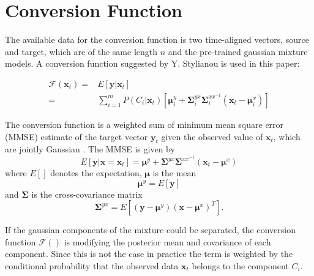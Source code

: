 \section{Conversion Function} %
\label{sec:conversion_function}
The available data for the conversion function is two time-aligned vectors, source and target, which are of the same length $n$ and the pre-trained gaussian mixture models. A conversion function suggested by Y. Stylianou \cite{stylianou95} is used in this paper:
\begin{defn}
	\label{defn:conversion_function}
	\begin{equation}
		\label{eq:conversion_function}
		\begin{split}
		\mathcal{F}(\mathbf{x}_t) =& E[\mathbf{y}\vert \mathbf{x}_t]\\
		 =& \sum_{i=1}^{m}P(C_i \vert \mathbf{x}_t)[\boldsymbol{\mu}_i^y + \mathbf{\Sigma}_i^{yx} \mathbf{\Sigma}_i^{xx^{-1}} (\mathbf{x}_t-\boldsymbol{\mu}_i^x)]
		\end{split}
	\end{equation}	
\end{defn}
The conversion function is a weighted sum of minimum mean square error (MMSE) estimate of the target vector $\mathbf{y}_t$ given the observed value of $\mathbf{x}_t$, which are jointly Gaussian \cite{stylianou98}. The MMSE is given by \cite{taletek}
\begin{equation}
	\label{eq:mmse}
	E[\mathbf{y}\vert \mathbf{x}=\mathbf{x}_t] = \boldsymbol{\mu}^y + \mathbf{\Sigma}^{yx} \mathbf{\Sigma}^{xx^{-1}} (\mathbf{x}_t-\boldsymbol{\mu}^x)
\end{equation}
where $E[]$ denotes the expectation, $\boldsymbol{\mu}$ is the mean
\begin{equation}
	\boldsymbol{\mu}^y = E[\mathbf{y}]
\end{equation}
and $\mathbf{\Sigma}$ is the cross-covariance matrix
\begin{equation}
	\mathbf{\Sigma}^{yx} = E[(\mathbf{y}-\boldsymbol{\mu}^y)(\mathbf{x}-\boldsymbol{\mu}^x)^T].
\end{equation}

If the gaussian components of the mixture could be separated, the conversion function $\mathcal{F}()$ is modifying the posterior mean and covariance of each component. Since this is not the case in practice the term is weighted by the conditional probability that the observed data $\mathbf{x}_t$ belongs to the component $C_i$.

